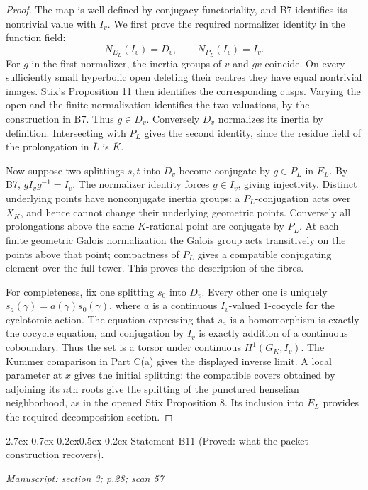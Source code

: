 \documentclass[11pt,a4paper]{article}
\makeatletter
\newcommand{\passage}[1]{\par\smallskip\noindent\textit{Manuscript: #1}\par\smallskip}
\renewcommand\paragraph{\@startsection{paragraph}{4}{\z@}%
  {2.7ex \@plus 0.7ex \@minus 0.2ex}{0.5ex \@plus 0.2ex}%
  {\normalfont\normalsize\bfseries}}
\makeatother
\begin{document}
\begin{proof}
The map is well defined by conjugacy functoriality, and B7 identifies
its nontrivial value with $I_v$. We first prove the required normalizer
identity in the function field:
\[
 N_{E_L}(I_v)=D_v,\qquad N_{P_L}(I_v)=I_v.
\]
For $g$ in the first normalizer, the inertia groups of $v$ and $gv$
coincide. On every sufficiently small hyperbolic open deleting their
centres they have equal nontrivial images. Stix's Proposition 11 then
identifies the corresponding cusps. Varying the open and the finite
normalization identifies the two valuations, by the construction in B7.
Thus $g\in D_v$. Conversely $D_v$ normalizes its inertia by definition.
Intersecting with $P_L$ gives the second identity, since the residue
field of the prolongation in $\overline L$ is $\overline K$.

Now suppose two splittings $s,t$ into $D_v$ become conjugate by
$g\in P_L$ in $E_L$. By B7, $gI_vg^{-1}=I_v$. The normalizer identity
forces $g\in I_v$, giving injectivity. Distinct underlying points have
nonconjugate inertia groups: a $P_L$-conjugation acts over
$X_{\overline K}$, and hence cannot change their underlying geometric
points. Conversely all prolongations above the same $K$-rational point
are conjugate by $P_L$. At each finite geometric Galois normalization the
Galois group acts transitively on the points above that point; compactness
of $P_L$ gives a compatible conjugating element over the full tower.
This proves the description of the fibres.

For completeness, fix one splitting $s_0$ into $D_v$. Every other one is
uniquely $s_a(\gamma)=a(\gamma)s_0(\gamma)$, where $a$ is a continuous
$I_v$-valued $1$-cocycle for the cyclotomic action. The equation expressing
that $s_a$ is a homomorphism is exactly the cocycle equation, and
conjugation by $I_v$ is exactly addition of a continuous coboundary.
Thus the set is a torsor under continuous $H^1(G_K,I_v)$. The Kummer
comparison in Part C(a) gives the displayed inverse limit. A local
parameter at $x$ gives the initial splitting: the compatible covers
obtained by adjoining its $n$th roots give the splitting of the punctured
henselian neighborhood, as in the opened Stix Proposition 8. Its
inclusion into $E_L$ provides the required decomposition section.
\end{proof}

\paragraph{Statement B11 (Proved: what the packet construction recovers).}\label{res:B11}
\passage{section 3; p.28; scan 57}
\end{document}
